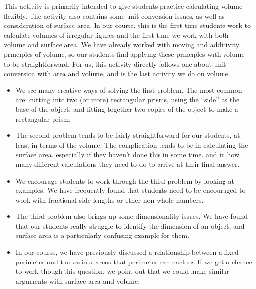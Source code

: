 \documentclass[nooutcomes]{ximera}
\begin{document}
\newpage
\begin{instructorNotes}
This activity is primarily intended to give students practice calculating volume flexibly.  The activity also contains some unit conversion issues, as well as consideration of surface area.  In our course, this is the first time students work to calculate volumes of irregular figures and the first time we work with both volume and surface area.  We have already worked with moving and additivity principles of volume, so our students find applying these principles with volume to be straightforward.  For us, this activity directly follows one about unit conversion with area and volume, and is the last activity we do on volume.

\begin{itemize}
    \item We see many creative ways of solving the first problem.  The most common are: cutting into two (or more) rectangular prisms, using the ``side'' as the base of the object, and fitting together two copies of the object to make a rectangular prism.
    \item The second problem tends to be fairly straightforward for our students, at least in terms of the volume.  The complication tends to be in calculating the surface area, especially if they haven't done this in some time, and in how many different calculations they need to do to arrive at their final answer. 
    \item We encourage students to work through the third problem by looking at examples.  We have frequently found that students need to be encouraged to work with fractional side lengths or other non-whole numbers.
    \item The third problem also brings up some dimensionality issues.  We have found that our students really struggle to identify the dimension of an object, and surface area is a particularly confusing example for them.  
    \item In our course, we have previously discussed a relationship between a fixed perimeter and the various areas that perimeter can enclose.  If we get a chance to work though this question, we point out that we could make similar arguments with surface area and volume.

\end{itemize}


\end{instructorNotes}
\end{document}
